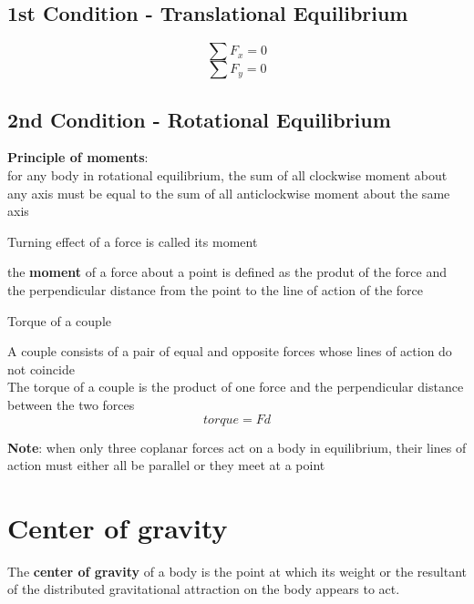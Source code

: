 \documentclass[a4paper, 10pt]{article}
\begin{document}
\subsection{1st Condition - Translational Equilibrium}
\[
\sum F_x = 0
\]
\[
\sum F_y = 0
\]

\subsection{2nd Condition - Rotational Equilibrium}
\begin{framed}
   \textbf{Principle of moments}: \\
   for any body in rotational equilibrium, the sum of all clockwise moment about any axis must be equal to the sum of all anticlockwise moment about the same axis
\end{framed}	

Turning effect of a force is called its moment
\begin{framed}
   the \textbf{moment} of a force about a point is defined as the produt of the force and the perpendicular distance from the point to the line of action of the force
\end{framed}	

Torque of a couple
\begin{framed}
   A couple consists of a pair of equal and opposite forces whose lines of action do not coincide \\ 
   The torque of a couple is the product of one force and the perpendicular distance between the two forces
   \[
   torque = Fd
   \]
   
\end{framed}	

\textbf{Note}: when only three coplanar forces act on a body in equilibrium, their lines of action must either all be parallel or they meet at a point

\section{Center of gravity}
\begin{framed}
   The \textbf{center of gravity} of a body is the point at which its weight or the resultant of the distributed gravitational attraction on the body appears to act.
\end{framed}	
\end{document}
